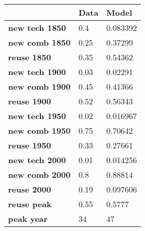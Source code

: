 \begin{tabular}{|l|l|l|}
\hline
&\textbf{Data}&\textbf{Model}\\\hline
\textbf{new tech 1850}&0.4&0.083392\\\hline
\textbf{new comb 1850}&0.25&0.37299\\\hline
\textbf{reuse 1850}&0.35&0.54362\\\hline
\textbf{new tech 1900}&0.03&0.02291\\\hline
\textbf{new comb 1900}&0.45&0.41366\\\hline
\textbf{reuse 1900}&0.52&0.56343\\\hline
\textbf{new tech 1950}&0.02&0.016967\\\hline
\textbf{new comb 1950}&0.75&0.70642\\\hline
\textbf{reuse 1950}&0.33&0.27661\\\hline
\textbf{new tech 2000}&0.01&0.014256\\\hline
\textbf{new comb 2000}&0.8&0.88814\\\hline
\textbf{reuse 2000}&0.19&0.097606\\\hline
\textbf{reuse peak}&0.55&0.5777\\\hline
\textbf{peak year}&34&47\\\hline
\end{tabular}
